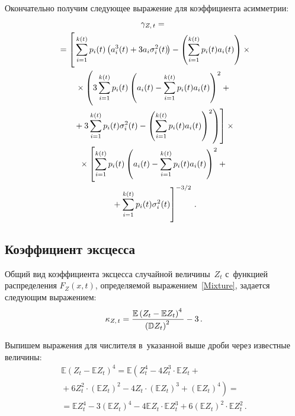 \begin{multicols}{2}
Окончательно получим следующее выражение для коэффициента асимметрии:
\begin{multline}
\gamma_{Z,\,t}={}\\
{}=\left[
\vphantom{\left(a_i(t)-
\sum\limits_{i=1}^{k(t)} p_i(t) a_i(t)\right)^2}
\sum\limits_{i=1}^{k(t)} p_i(t)\left(
a_i^3(t)+3a_i\sigma_i^2(t)\!\right)-\left(\sum\limits_{i=1}^{k(t)} 
p_i(t) a_i(t)\right)\times{}\right.\hspace*{-3.48pt}\\
{}\times\left(3\sum\limits_{i=1}^{k(t)} p_i(t) \left(a_i(t)-
\sum\limits_{i=1}^{k(t)} p_i(t) a_i(t)\right)^2+{}\right.\\
\left.\left.{}+
3\sum\limits_{i=1}^{k(t)} p_i(t) \sigma_i^2(t)-\left(
\sum\limits_{i=1}^{k(t)} p_i(t) a_i(t)\right)^2\right)\right]\times{}\\
{}\times\left[\sum\limits_{i=1}^{k(t)} p_i(t) \left(a_i(t)-
\sum\limits_{i=1}^{k(t)} p_i(t) a_i(t)\right)^2+{}\right.\\
\left.{}+
\sum\limits_{i=1}^{k(t)} p_i(t) \sigma_i^2(t)
\vphantom{\sum\limits_{i=1}^{k(t)} p_i(t) \left(a_i(t)-
\sum\limits_{i=1}^{k(t)} p_i(t) a_i(t)\right)^2}
\right]^{-3/2}\,.
\label{Skewness}
\end{multline}

\subsection{Коэффициент эксцесса}

Общий вид коэффициента эксцесса случайной величины~$Z_t$ с~функцией 
распределения $F_Z(x,t)$, определяемой выражением~\eqref{Mixture}, 
задается следу\-ющим выражением:
\begin{equation*}
\kappa_{Z,\,t}=\displaystyle\frac{\displaystyle \mathbb{E} \left(Z_t-\mathbb{E} Z_t\right)^4\mathstrut}{\displaystyle \left(\mathbb{D} Z_t\right)^2\mathstrut}-3\,.
\end{equation*}

Выпишем выражения для числителя в~указанной выше дроби через известные величины:
\begin{multline*}
\mathbb{E} \left(Z_t-\mathbb{E} Z_t\right)^4=
\mathbb{E} \left(Z_t^4-4Z_t^3\cdot\mathbb{E} Z_t+{}\right.\\
\left.{}+6Z_t^2\cdot
\left(\mathbb{E} Z_t\right)^2-4Z_t\cdot \left(\mathbb{E} Z_t\right)^3+
\left(\mathbb{E} Z_t\right)^4\right)={}\\
{}=\mathbb{E} Z_t^4-3\left(\mathbb{E} Z_t\right)^4-
4\mathbb{E} Z_t\cdot \mathbb{E} Z_t^3+
6\left(\mathbb{E} Z_t\right)^2\cdot \mathbb{E} Z_t^2\,.
\end{multline*}


\end{multicols}
